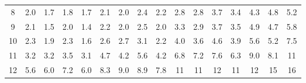 \begin{table}[!htbp]
\begin{tabular}{c|ccccccccccccccc}
    \rowcolor[HTML]{FFFFFF} 
    8                          & \multicolumn{1}{l|}{\cellcolor[HTML]{CCC0DA}2.0} & \cellcolor[HTML]{CCC0DA}1.7 & \cellcolor[HTML]{CCC0DA}1.8 & \cellcolor[HTML]{CCC0DA}1.7 & 2.1                         & \multicolumn{1}{l|}{\cellcolor[HTML]{CCC0DA}2.0} & 2.4                        & 2.2                         & 2.8                         & 2.8                         & 3.7                         & 3.4                         & 4.3                         & 4.8                         & 5.2                         \\
    \rowcolor[HTML]{FFFFFF} 
    9                          & \multicolumn{1}{l|}{\cellcolor[HTML]{FFFFFF}2.1} & \cellcolor[HTML]{B1A0C7}1.5 & \cellcolor[HTML]{CCC0DA}2.0 & \cellcolor[HTML]{B1A0C7}1.4 & 2.2                         & \multicolumn{1}{l|}{\cellcolor[HTML]{CCC0DA}2.0} & 2.5                        & \cellcolor[HTML]{CCC0DA}2.0 & 3.3                         & 2.9                         & 3.7                         & 3.5                         & 4.9                         & 4.7                         & 5.8                         \\ \cline{3-7}
    \rowcolor[HTML]{FFFFFF} 
    10                         & 2.3                                              & \cellcolor[HTML]{CCC0DA}1.9 & 2.3                         & \cellcolor[HTML]{CCC0DA}1.6 & 2.6                         & 2.7                                              & 3.1                        & 2.2                         & 4.0                         & 3.6                         & 4.6                         & 3.9                         & 5.6                         & 5.2                         & 7.5                         \\
    \rowcolor[HTML]{FFFFFF} 
    11                         & 3.2                                              & 3.2                         & 3.5                         & 3.1                         & 4.7                         & 4.2                                              & 5.6                        & 4.2                         & 6.8                         & 7.2                         & 7.6                         & 6.3                         & 9.0                         & 8.1                         & \cellcolor[HTML]{8DB4E2}11  \\
    \rowcolor[HTML]{FFFFFF} 
    12                         & 5.6                                              & 6.0                         & 7.2                         & 6.0                         & 8.3                         & 9.0                                              & 8.9                        & 7.8                         & \cellcolor[HTML]{8DB4E2}11  & \cellcolor[HTML]{8DB4E2}11  & \cellcolor[HTML]{8DB4E2}12  & \cellcolor[HTML]{8DB4E2}11  & \cellcolor[HTML]{8DB4E2}12  & \cellcolor[HTML]{8DB4E2}15  & \cellcolor[HTML]{8DB4E2}16  \\

\end{tabular}
\end{table}
